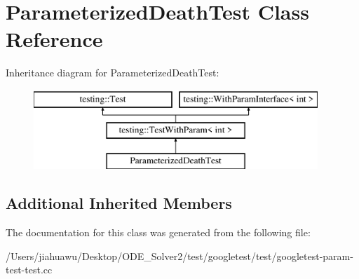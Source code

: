 \hypertarget{class_parameterized_death_test}{}\section{Parameterized\+Death\+Test Class Reference}
\label{class_parameterized_death_test}
Inheritance diagram for Parameterized\+Death\+Test\+:\begin{figure}[H]
\begin{center}
\leavevmode
\includegraphics[height=3.000000cm]{class_parameterized_death_test}
\end{center}
\end{figure}
\subsection*{Additional Inherited Members}


The documentation for this class was generated from the following file\+:\begin{DoxyCompactItemize}
\item 
/\+Users/jiahuawu/\+Desktop/\+O\+D\+E\+\_\+\+Solver2/test/googletest/test/googletest-\/param-\/test-\/test.\+cc\end{DoxyCompactItemize}
